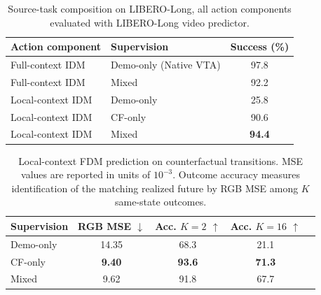 \begin{table}[!t]
    \centering
    \caption{
    Source-task composition on LIBERO-Long, all action components evaluated with LIBERO-Long video
    predictor.
    }
    \label{tab:component-source}
    \footnotesize
    \begin{tabular}{@{}llc@{}}
        \toprule
        \textbf{Action component}
        & \textbf{Supervision}
        & \textbf{Success (\%)} \\
        \midrule

        Full-context IDM
        & Demo-only (Native VTA)
        & 97.8 \\

        Full-context IDM
        & Mixed
        & 92.2 \\

        \midrule

        Local-context IDM
        & Demo-only
        & 25.8 \\

        Local-context IDM
        & CF-only
        & 90.6 \\

        Local-context IDM
        & Mixed
        & \textbf{94.4} \\

        \bottomrule
    \end{tabular}
\end{table}



\begin{table}[t]
    \centering
    \caption{
    Local-context FDM prediction on counterfactual transitions.
    MSE values are reported in units of $10^{-3}$.
    Outcome accuracy measures identification of the matching realized future
    by RGB MSE among $K$ same-state outcomes.
    }
    \label{tab:fdm}
    \small
    \begin{tabular}{@{}lcccc@{}}
        \toprule
        \textbf{Supervision}
        & \textbf{RGB MSE $\downarrow$}
        & \textbf{Acc.} $K{=}2$ $\uparrow$
        & \textbf{Acc.} $K{=}16$ $\uparrow$ \\
        \midrule
        Demo-only
        & 14.35
        & 68.3
        & 21.1 \\
        CF-only
        & \textbf{9.40}
        & \textbf{93.6}
        & \textbf{71.3} \\
        Mixed
        & 9.62
        & 91.8
        & 67.7 \\
        \bottomrule
    \end{tabular}
    \vspace{-0.2in}
\end{table}

